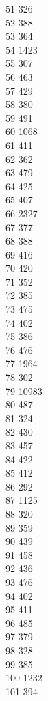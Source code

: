 { 51	326 \\
 52	388 \\
 53	364 \\
 54	1423 \\
 55	307 \\
 56	463 \\
 57	429 \\
 58	380 \\
 59	491 \\
 60	1068 \\
 61	411 \\
 62	362 \\
 63	479 \\
 64	425 \\
 65	407 \\
 66	2327 \\
 67	377 \\
 68	388 \\
 69	416 \\
 70	420 \\
 71	352 \\
 72	385 \\
 73	475 \\
 74	402 \\
 75	386 \\
 76	476 \\
 77	1964 \\
 78	302 \\
 79	10983 \\
 80	487 \\
 81	324 \\
 82	430 \\
 83	457 \\
 84	422 \\
 85	412 \\
 86	292 \\
 87	1125 \\
 88	320 \\
 89	359 \\
 90	439 \\
 91	458 \\
 92	436 \\
 93	476 \\
 94	402 \\
 95	411 \\
 96	485 \\
 97	379 \\
 98	328 \\
 99	385 \\
 100	1232 \\
 101	394 \\
}
